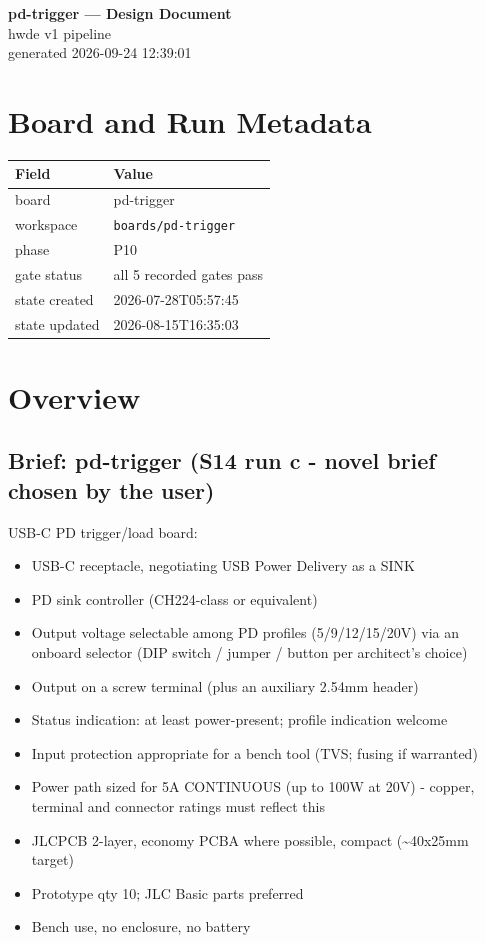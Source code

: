 \documentclass[11pt,a4paper]{article}
\begin{document}
\sloppy
\begin{center}
{\LARGE\bfseries pd-trigger --- Design Document}\\[6pt]
{\large hwde v1 pipeline}\\[2pt]
generated 2026-09-24 12:39:01
\end{center}
\tableofcontents

\section{Board and Run Metadata}
{\small
\begin{longtable}{lp{11cm}}
\toprule
\textbf{Field} & \textbf{Value} \\
\midrule
\endhead
board & pd-trigger \\
workspace & \texttt{boards/pd-trigger} \\
phase & P10 \\
gate status & all 5 recorded gates pass \\
state created & 2026-07-28T05:57:45 \\
state updated & 2026-08-15T16:35:03 \\
\bottomrule
\end{longtable}
}
\section{Overview}
\subsection*{Brief: pd-trigger (S14 run c - novel brief chosen by the user)}
USB-C PD trigger/load board:

\begin{itemize}
\item USB-C receptacle, negotiating USB Power Delivery as a SINK
\item PD sink controller (CH224-class or equivalent)
\item Output voltage selectable among PD profiles (5/9/12/15/20V) via an
onboard selector (DIP switch / jumper / button per architect's choice)
\item Output on a screw terminal (plus an auxiliary 2.54mm header)
\item Status indication: at least power-present; profile indication welcome
\item Input protection appropriate for a bench tool (TVS; fusing if warranted)
\item Power path sized for 5A CONTINUOUS (up to 100W at 20V) - copper, terminal
and connector ratings must reflect this
\item JLCPCB 2-layer, economy PCBA where possible, compact (\textasciitilde{}40x25mm target)
\item Prototype qty 10; JLC Basic parts preferred
\item Bench use, no enclosure, no battery
\end{itemize}
\end{document}
